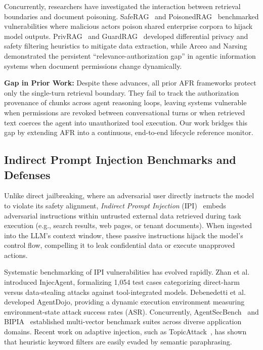 Concurrently, researchers have investigated the interaction between retrieval boundaries and document poisoning. SafeRAG~\cite{liang2025saferag} and PoisonedRAG~\cite{zou2025poisonedrag} benchmarked vulnerabilities where malicious actors poison shared enterprise corpora to hijack model outputs. PrivRAG~\cite{privrag2025acl} and GuardRAG~\cite{guardrag2025} developed differential privacy and safety filtering heuristics to mitigate data extraction, while Arceo and Narsing~\cite{arceo2026securing} demonstrated the persistent ``relevance-authorization gap'' in agentic information systems when document permissions change dynamically.

\noindent\textbf{Gap in Prior Work:} Despite these advances, all prior AFR frameworks protect only the single-turn retrieval boundary. They fail to track the authorization provenance of chunks across agent reasoning loops, leaving systems vulnerable when permissions are revoked between conversational turns or when retrieved text coerces the agent into unauthorized tool execution. Our work bridges this gap by extending AFR into a continuous, end-to-end lifecycle reference monitor.

\subsection{Indirect Prompt Injection Benchmarks and Defenses}
\label{sec:rel_injection}

Unlike direct jailbreaking, where an adversarial user directly instructs the model to violate its safety alignment, \textit{Indirect Prompt Injection} (IPI)~\cite{greshake2023promptinject, sha2024promptinjection} embeds adversarial instructions within untrusted external data retrieved during task execution (e.g., search results, web pages, or tenant documents). When ingested into the LLM's context window, these passive instructions hijack the model's control flow, compelling it to leak confidential data or execute unapproved actions.

Systematic benchmarking of IPI vulnerabilities has evolved rapidly. Zhan et al.~\cite{zhan2024injecagent} introduced InjecAgent, formalizing 1,054 test cases categorizing direct-harm versus data-stealing attacks against tool-integrated models. Debenedetti et al.~\cite{debenedetti2024agentdojo} developed AgentDojo, providing a dynamic execution environment measuring environment-state attack success rates (ASR). Concurrently, AgentSecBench~\cite{zhang2025agentsecbench} and BIPIA~\cite{yi2025bipia} established multi-vector benchmark suites across diverse application domains. Recent work on adaptive injection, such as TopicAttack~\cite{topicattack2025}, has shown that heuristic keyword filters are easily evaded by semantic paraphrasing.

